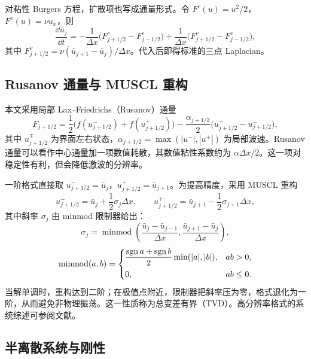 对粘性 Burgers 方程，扩散项也写成通量形式。令 $F^{c}(u)=u^2/2$，$F^{v}(u)=\nu u_x$，则
\begin{equation}
  \frac{\dd \bar u_j}{\dd t}
  =-\frac{1}{\Delta x}\bigl(F^{c}_{j+1/2}-F^{c}_{j-1/2}\bigr)
  +\frac{1}{\Delta x}\bigl(F^{v}_{j+1/2}-F^{v}_{j-1/2}\bigr),
  \label{eq:fv-burgers}
\end{equation}
其中 $F^{v}_{j+1/2}=\nu(\bar u_{j+1}-\bar u_j)/\Delta x$。代入后即得标准的三点 Laplacian。

\subsection{Rusanov 通量与 MUSCL 重构}

本文采用局部 Lax--Friedrichs（Rusanov）通量
\begin{equation}
  F_{j+1/2}=\frac12\bigl(f(u^-_{j+1/2})+f(u^+_{j+1/2})\bigr)
  -\frac{\alpha_{j+1/2}}{2}\bigl(u^+_{j+1/2}-u^-_{j+1/2}\bigr),
  \label{eq:rusanov}
\end{equation}
其中 $u^\mp_{j+1/2}$ 为界面左右状态，$\alpha_{j+1/2}=\max(|u^-|,|u^+|)$ 为局部波速。Rusanov 通量可以看作中心通量加一项数值耗散，其数值粘性系数约为 $\alpha\Delta x/2$。这一项对稳定性有利，但会降低激波的分辨率。

一阶格式直接取 $u^-_{j+1/2}=\bar u_j$，$u^+_{j+1/2}=\bar u_{j+1}$。为提高精度，采用 MUSCL 重构
\begin{equation}
  u^-_{j+1/2}=\bar u_j+\frac12\sigma_j\Delta x,\qquad
  u^+_{j+1/2}=\bar u_{j+1}-\frac12\sigma_{j+1}\Delta x,
  \label{eq:muscl}
\end{equation}
其中斜率 $\sigma_j$ 由 minmod 限制器给出：
\begin{equation}
  \sigma_j=\operatorname{minmod}\left(
  \frac{\bar u_j-\bar u_{j-1}}{\Delta x},
  \frac{\bar u_{j+1}-\bar u_j}{\Delta x}\right),
  \label{eq:minmod}
\end{equation}
\begin{equation}
  \operatorname{minmod}(a,b)=
  \begin{cases}
    \dfrac{\operatorname{sgn} a+\operatorname{sgn} b}{2}\min(|a|,|b|), & ab>0,\\[6pt]
    0, & ab\le0.
  \end{cases}
  \label{eq:minmod-def}
\end{equation}
当解单调时，重构达到二阶；在极值点附近，限制器把斜率压为零，格式退化为一阶，从而避免非物理振荡。这一性质称为总变差有界（TVD）。高分辨率格式的系统综述可参阅文献\cite{shu1998}。

\subsection{半离散系统与刚性}

